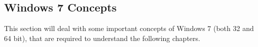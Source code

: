 \subsection{Windows 7 Concepts}
This section will deal with some important concepts of Windows 7 (both 32 and 64 bit), that are required to understand the following chapters.


